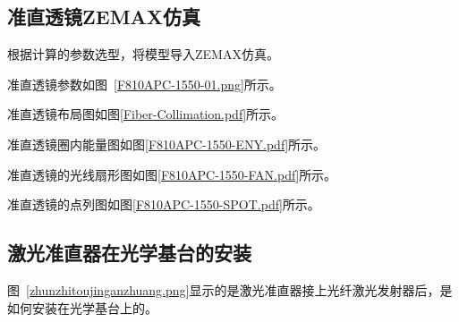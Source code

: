 \subsection{准直透镜ZEMAX仿真}
根据计算的参数选型，将模型导入ZEMAX仿真。

准直透镜参数如图~\ref{F810APC-1550-01.png}所示。

准直透镜布局图如图\ref{Fiber-Collimation.pdf}所示。

准直透镜圈内能量图如图\ref{F810APC-1550-ENY.pdf}所示。

准直透镜的光线扇形图如图\ref{F810APC-1550-FAN.pdf}所示。

准直透镜的点列图如图\ref{F810APC-1550-SPOT.pdf}所示。







\subsection{激光准直器在光学基台的安装}
图~\ref{zhunzhitoujinganzhuang.png}显示的是激光准直器接上光纤激光发射器后，是如何安装在光学基台上的。


